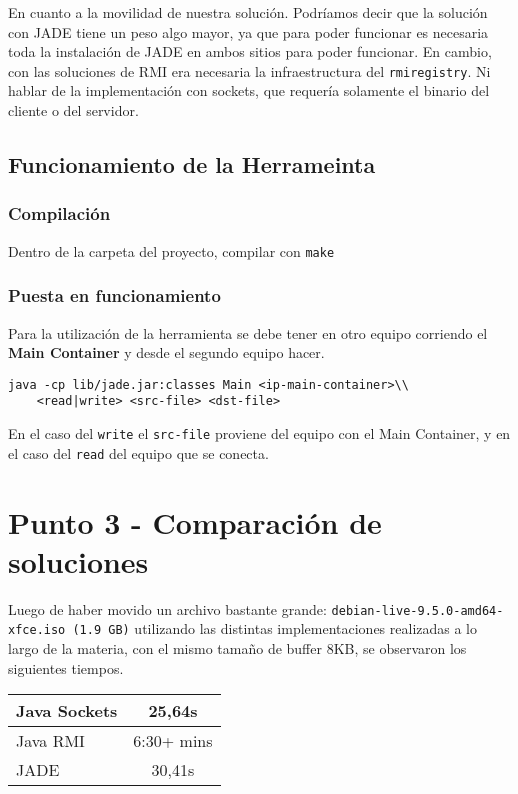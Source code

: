 En cuanto a la movilidad de nuestra solución. Podríamos decir que la solución con JADE tiene un peso algo mayor, ya que para poder funcionar es necesaria toda la instalación de JADE en ambos sitios para poder funcionar. En cambio, con las soluciones de RMI era necesaria la infraestructura del \texttt{rmiregistry}. Ni hablar de la implementación con sockets, que requería solamente el binario del cliente o del servidor.

\subsection{Funcionamiento de la Herrameinta}

\subsubsection{Compilación}

Dentro de la carpeta del proyecto, compilar con \texttt{make} 

\subsubsection{Puesta en funcionamiento}

Para la utilización de la herramienta se debe tener en otro equipo corriendo el \textbf{Main Container} y desde el segundo equipo hacer.

\begin{lstlisting}[breaklines=true]
java -cp lib/jade.jar:classes Main <ip-main-container>\\
    <read|write> <src-file> <dst-file>
\end{lstlisting}

En el caso del \texttt{write} el \texttt{src-file} proviene del equipo con el Main Container, y en el caso del \texttt{read} del equipo que se conecta.

\section{Punto 3 - Comparación de soluciones}

Luego de haber movido un archivo bastante grande: \texttt{debian-live-9.5.0-amd64-xfce.iso (1.9 GB)} utilizando las distintas implementaciones realizadas a lo largo de la materia, con el mismo tamaño de buffer 8KB, se observaron los siguientes tiempos.

\begin{center}
  \begin{tabular}{ | l | c | }
    \hline
    Java Sockets & 25,64s \\
    \hline
    Java RMI & 6:30+ mins\\
    \hline
    JADE & 30,41s \\
    \hline
  \end{tabular}
\end{center}

